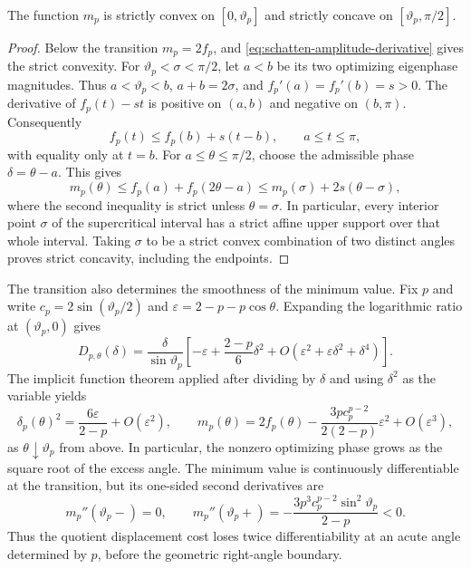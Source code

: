 \begin{proposition}
\label{prop:schatten-value-convexity}
The function $m_p$ is strictly convex on $[0,\vartheta_p]$ and strictly
concave on $[\vartheta_p,\pi/2]$.
\end{proposition}

\begin{proof}
Below the transition $m_p=2f_p$, and
\cref{eq:schatten-amplitude-derivative} gives the strict convexity.
For $\vartheta_p<\sigma<\pi/2$, let $a<b$ be its two optimizing
eigenphase magnitudes. Thus $a<\vartheta_p<b$, $a+b=2\sigma$, and
$f_p'(a)=f_p'(b)=s>0$. The derivative of $f_p(t)-st$ is positive on
$(a,b)$ and negative on $(b,\pi)$. Consequently
\[
 f_p(t)\leq f_p(b)+s(t-b),\qquad a\leq t\leq\pi,
\]
with equality only at $t=b$. For $a\leq\theta\leq\pi/2$, choose the
admissible phase $\delta=\theta-a$. This gives
\begin{equation}
 m_p(\theta)\leq f_p(a)+f_p(2\theta-a)
       \leq m_p(\sigma)+2s(\theta-\sigma),
 \label{eq:schatten-balanced-support}
\end{equation}
where the second inequality is strict unless $\theta=\sigma$.
In particular, every interior point $\sigma$ of the supercritical
interval has a strict affine upper support over that whole interval.
Taking $\sigma$ to be a strict convex combination of two distinct
angles proves strict concavity, including the endpoints.
\end{proof}

The transition also determines the smoothness of the minimum value.
Fix $p$ and write $c_p=2\sin(\vartheta_p/2)$ and
$\varepsilon=2-p-p\cos\theta$. Expanding the logarithmic ratio at
$(\vartheta_p,0)$ gives
\[
 D_{p,\theta}(\delta)
 =\frac{\delta}{\sin\vartheta_p}
   \left[-\varepsilon+\frac{2-p}{6}\delta^2
       +O(\varepsilon^2+\varepsilon\delta^2+\delta^4)\right].
\]
The implicit function theorem applied after dividing by $\delta$ and
using $\delta^2$ as the variable yields
\begin{equation}
 \delta_p(\theta)^2
    =\frac{6\varepsilon}{2-p}+O(\varepsilon^2),\qquad
 m_p(\theta)=2f_p(\theta)
    -\frac{3p c_p^{p-2}}{2(2-p)}\varepsilon^2
    +O(\varepsilon^3),
 \label{eq:schatten-transition-asymptotics}
\end{equation}
as $\theta\downarrow\vartheta_p$ from above. In particular, the
nonzero optimizing phase grows as the square root of the excess angle.
The minimum value is continuously differentiable at the transition, but
its one-sided second derivatives are
\[
 m_p''(\vartheta_p-)=0,\qquad
 m_p''(\vartheta_p+)
   =-\frac{3p^3 c_p^{p-2}\sin^2\vartheta_p}{2-p}<0.
\]
Thus the quotient displacement cost loses twice differentiability at an
acute angle determined by $p$, before the geometric right-angle boundary.

